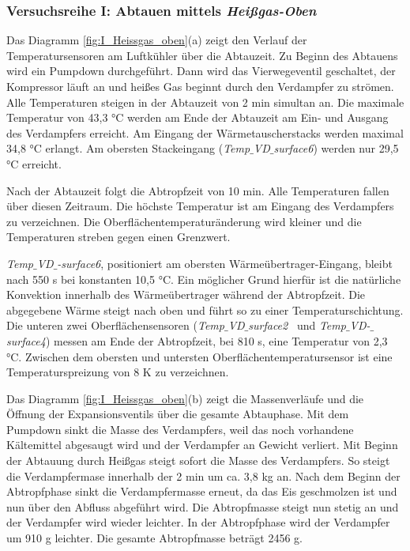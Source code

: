 \newpage
\subsubsection*{Versuchsreihe I: Abtauen mittels \textit{Heißgas-Oben}}

Das Diagramm \ref{fig:I_Heissgas_oben}(a) zeigt den Verlauf der Temperatursensoren am Luftkühler über die Abtauzeit. Zu Beginn des Abtauens wird ein Pumpdown durchgeführt. Dann wird das Vierwegeventil geschaltet, der Kompressor läuft an und heißes Gas beginnt durch den Verdampfer zu strömen. Alle Temperaturen steigen in der Abtauzeit von 2 min simultan an. Die maximale Temperatur von 43,3 °C werden am Ende der Abtauzeit am Ein- und Ausgang des Verdampfers erreicht. 
Am Eingang der Wärmetauscherstacks werden maximal 34,8 °C erlangt. Am obersten Stackeingang (\textit{Temp$\_$VD$\_$surface6}) werden nur 29,5 °C erreicht. 

Nach der Abtauzeit folgt die Abtropfzeit von 10 min. Alle Temperaturen fallen über diesen Zeitraum. Die höchste Temperatur ist am Eingang des Verdampfers zu verzeichnen. Die Oberflächentemperaturänderung wird kleiner und die Temperaturen streben gegen einen Grenzwert. 

\textit{Temp$\_$VD$\_$-surface6}, positioniert am obersten Wärmeübertrager-Eingang, bleibt nach 550 s bei konstanten  10,5 °C. Ein möglicher Grund hierfür ist die natürliche Konvektion innerhalb des Wärmeübertrager während der Abtropfzeit. Die abgegebene Wärme steigt nach oben und führt so zu einer Temperaturschichtung. Die unteren zwei Oberflächensensoren (\textit{Temp$\_$VD$\_$surface2}~ und  \textit{Temp$\_$VD-$\_$surface4}) messen am Ende der Abtropfzeit, bei 810 s, eine Temperatur von 2,3 °C. Zwischen dem obersten und untersten Oberflächentemperatursensor ist eine Temperaturspreizung von 8 K zu verzeichnen. 

Das Diagramm \ref{fig:I_Heissgas_oben}(b) zeigt die Massenverläufe und die Öffnung der Expansionsventils über die gesamte Abtauphase. Mit dem Pumpdown sinkt die Masse des Verdampfers, weil das noch vorhandene Kältemittel abgesaugt wird und der Verdampfer an Gewicht verliert. Mit Beginn der Abtauung durch Heißgas steigt sofort die Masse des Verdampfers. So steigt die Verdampfermase innerhalb der 2 min um ca. 3,8 kg an. Nach dem Beginn der Abtropfphase sinkt die Verdampfermasse erneut, da das Eis geschmolzen ist und nun über den Abfluss abgeführt wird. Die Abtropfmasse steigt nun stetig an und der Verdampfer wird wieder leichter. In der Abtropfphase wird der Verdampfer um 910 g leichter. Die gesamte Abtropfmasse beträgt 2456 g. 


